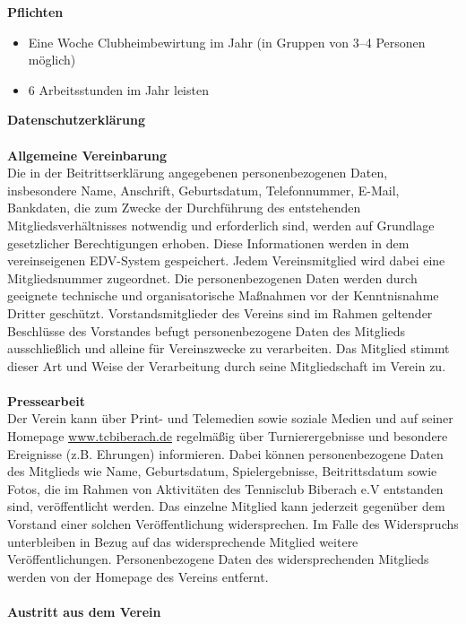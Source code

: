 \begin{Form}
	{
		\huge
		\centering
		\textbf{Pflichten}\\
	}
	\noindent
	\begin{itemize}
		\item Eine Woche Clubheimbewirtung im Jahr (in Gruppen von 3--4 Personen möglich)
		\item 6 Arbeitsstunden im Jahr leisten
	\end{itemize}
	{
		\huge
		\centering
		\textbf{Datenschutzerklärung}\\\ \\
	}
	\noindent
	\textbf{\Large Allgemeine Vereinbarung}\\
	Die in der Beitrittserklärung angegebenen personenbezogenen Daten, insbesondere Name, Anschrift, Geburtsdatum, Telefonnummer, E-Mail, Bankdaten, die zum Zwecke der Durchführung des entstehenden Mitgliedsverhältnisses notwendig und erforderlich sind, werden auf Grundlage gesetzlicher Berechtigungen erhoben. Diese Informationen werden in dem vereinseigenen EDV-System gespeichert. Jedem Vereinsmitglied wird dabei eine Mitgliedsnummer zugeordnet. Die personenbezogenen Daten werden durch geeignete technische und organisatorische Maßnahmen vor der Kenntnisnahme Dritter geschützt. Vorstandsmitglieder des Vereins sind im Rahmen geltender Beschlüsse des Vorstandes befugt personenbezogene Daten des Mitglieds ausschließlich und alleine für Vereinszwecke zu verarbeiten. Das Mitglied stimmt dieser Art und Weise der Verarbeitung durch seine Mitgliedschaft im Verein zu.\\\\
	\noindent
	\textbf{\Large Pressearbeit}\\
	Der Verein kann über Print- und Telemedien sowie soziale Medien und auf seiner Homepage \url{www.tcbiberach.de} regelmäßig über Turnierergebnisse und besondere Ereignisse (z.B. Ehrungen) informieren.	Dabei können personenbezogene Daten des Mitglieds wie Name, Geburtsdatum, Spielergebnisse, Beitrittsdatum sowie Fotos, die im Rahmen von Aktivitäten des Tennisclub Biberach e.V entstanden sind, veröffentlicht werden. Das einzelne Mitglied kann jederzeit gegenüber dem Vorstand einer solchen Veröffentlichung widersprechen. Im Falle des Widerspruchs unterbleiben in Bezug auf das widersprechende Mitglied weitere Veröffentlichungen. Personenbezogene Daten des widersprechenden Mitglieds werden von der Homepage des Vereins entfernt.\\\\
	\noindent
	\textbf{\Large Austritt aus dem Verein}\\

\end{Form}
